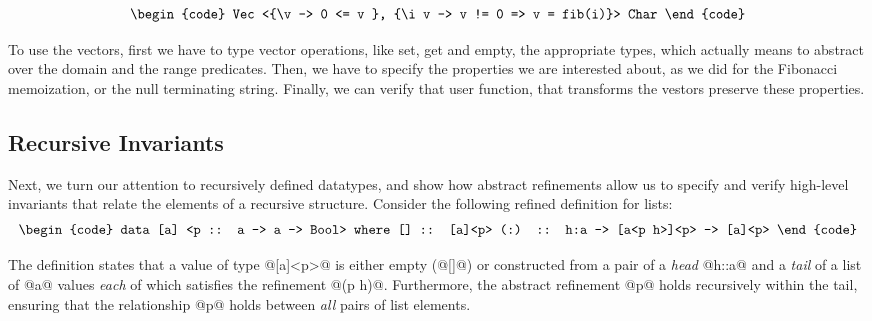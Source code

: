$$\centering\begin{tabular}{c}\begin{code}
Vec <{\v -> 0 <= v }, {\i v -> v != 0 => v = fib(i)}> Char
\end{code}\end{tabular}$$

To use the vectors, first we have to type vector operations, like 
set, get and empty, the appropriate types, which actually means 
to abstract over the domain and the range predicates. 
%
Then, we have to specify the properties we are interested about, 
as we did for the Fibonacci memoization, or the null terminating string.
% 
Finally, we can verify that user function, that transforms the vestors
preserve these properties.

\subsection{Recursive Invariants}

Next, we turn our attention to recursively defined datatypes, and show 
how abstract refinements allow us to specify and verify high-level
invariants that relate the elements of a recursive structure.
Consider the following refined definition for lists:
%
$$\centering\begin{tabular}{c}\begin{code}
data [a] <p :: a -> a -> Bool> where
  []  :: [a]<p>
  (:) :: h:a -> [a<p h>]<p> -> [a]<p>
\end{code}\end{tabular}$$

The definition states that a value of type @[a]<p>@ 
is either empty (@[]@) or constructed from a pair of  
a \emph{head} @h::a@ and a \emph{tail} of a list of 
@a@ values \emph{each} of which satisfies the refinement @(p h)@. 
Furthermore, the abstract refinement @p@ holds recursively
within the tail, ensuring that the relationship @p@ 
holds between \emph{all} pairs of list elements.

